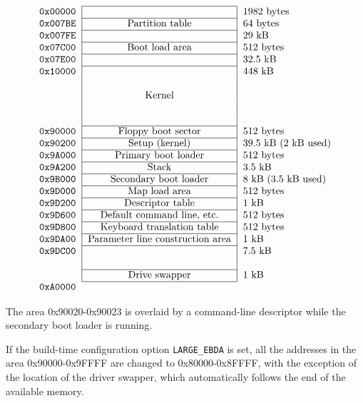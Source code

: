 $$
\begin{tabular}{l|c|l}
  \cline{2-2}
  \tt 0x00000 & & 1982 bytes \\
  \cline{2-2}
  \tt 0x007BE & Partition table & 64 bytes \\
  \cline{2-2}
  \tt 0x007FE & & 29 kB \\
  \cline{2-2}
  \tt 0x07C00 & Boot load area & 512 bytes \\
  \cline{2-2}
  \tt 0x07E00 & & 32.5 kB \\
  \cline{2-2}
  \tt 0x10000 & & 448 kB \\
  & & \\
  & Kernel & \\
  & & \\
  & & \\
  \cline{2-2}
  \tt 0x90000 & Floppy boot sector & 512 bytes \\
  \cline{2-2}
  \tt 0x90200 & Setup (kernel) & 39.5 kB (2 kB used) \\
  \cline{2-2}
  \tt 0x9A000 & Primary boot loader & 512 bytes \\
  \cline{2-2}
  \tt 0x9A200 & Stack & 3.5 kB \\
  \cline{2-2}
  \tt 0x9B000 & Secondary boot loader & 8 kB (3.5 kB used) \\
  \cline{2-2}
  \tt 0x9D000 & Map load area & 512 bytes \\
  \cline{2-2}
  \tt 0x9D200 & Descriptor table & 1 kB \\
  \cline{2-2}
  \tt 0x9D600 & Default command line, etc. & 512 bytes \\
  \cline{2-2}
  \tt 0x9D800 & Keyboard translation table & 512 bytes \\
  \cline{2-2}
  \tt 0x9DA00 & Parameter line construction area & 1 kB \\
  \cline{2-2}
  \tt 0x9DC00 & & 7.5 kB \\
  & & \\
  \cline{2-2}
  & Drive swapper & 1 kB \\
  \cline{2-2}
  \multicolumn{3}{l}{\tt 0xA0000} \\
\end{tabular}
$$

The area 0x90020-0x90023 is overlaid by a command-line descriptor while
the secondary boot loader is running.

If the build-time configuration option {\tt LARGE\_EBDA} is set, all the
addresses in the area 0x90000-0x9FFFF are changed to 0x80000-0x8FFFF,
with the exception of the location of the driver swapper, which automatically
follows the end of the available memory.


